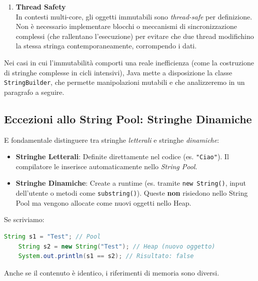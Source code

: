 \begin{enumerate}
    \item \textbf{Thread Safety} \\
    In contesti multi-core, gli oggetti immutabili sono \textit{thread-safe} per definizione. Non è necessario implementare blocchi o meccanismi di sincronizzazione complessi (che rallentano l'esecuzione) per evitare che due thread modifichino la stessa stringa contemporaneamente, corrompendo i dati.
\end{enumerate}

\begin{observation}
Nei casi in cui l'immutabilità comporti una reale inefficienza (come la costruzione di stringhe complesse in cicli intensivi), Java mette a disposizione la classe \texttt{StringBuilder}, che permette manipolazioni mutabili e che analizzeremo in un paragrafo a seguire.
\end{observation}

\subsection{Eccezioni allo String Pool: Stringhe Dinamiche}

E fondamentale distinguere tra stringhe \textit{letterali} e stringhe \textit{dinamiche}:

\begin{itemize}
    \item \textbf{Stringhe Letterali}: Definite direttamente nel codice (es. \texttt{"Ciao"}). Il compilatore le inserisce automaticamente nello \textit{String Pool}.
    \item \textbf{Stringhe Dinamiche}: Create a runtime (es. tramite \texttt{new String()}, input dell'utente o metodi come \texttt{substring()}). Queste \textbf{non} risiedono nello String Pool ma vengono allocate come nuovi oggetti nello Heap.
\end{itemize}

\begin{example}
    Se scriviamo:
    \begin{lstlisting}[language=Java]
    String s1 = "Test"; // Pool
    String s2 = new String("Test"); // Heap (nuovo oggetto)
    System.out.println(s1 == s2); // Risultato: false
    \end{lstlisting}
    Anche se il contenuto è identico, i riferimenti di memoria sono diversi.
\end{example}


